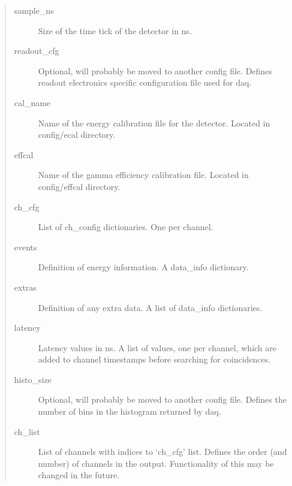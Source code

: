 \documentclass[letterpaper,10pt,english]{sphinxmanual}
\begin{document}
\begin{quote}
\begin{description}
\item[{sample\_ns}] \leavevmode
\sphinxAtStartPar
Size of the time tick of the detector in ns.

\item[{readout\_cfg}] \leavevmode
\sphinxAtStartPar
Optional, will probably be moved to another config file. Defines readout electronics
specific configuration file used for daq.

\item[{cal\_name}] \leavevmode
\sphinxAtStartPar
Name of the energy calibration file for the detector. Located in config/ecal directory.

\item[{effcal}] \leavevmode
\sphinxAtStartPar
Name of the gamma efficiency calibration file. Located in config/effcal directory.

\item[{ch\_cfg}] \leavevmode
\sphinxAtStartPar
List of ch\_config dictionaries. One per channel.

\item[{events}] \leavevmode
\sphinxAtStartPar
Definition of energy information. A data\_info dictionary.

\item[{extras}] \leavevmode
\sphinxAtStartPar
Definition of any extra data. A list of data\_info dictionaries.

\item[{latency}] \leavevmode
\sphinxAtStartPar
Latency values in ns. A list of values, one per channel, which are added to channel
timestamps before searching for coincidences.

\item[{histo\_size}] \leavevmode
\sphinxAtStartPar
Optional, will probably be moved to another config file. Defines the number of bins in
the histogram returned by daq.

\item[{ch\_list}] \leavevmode
\sphinxAtStartPar
List of channels with indices to ‘ch\_cfg’ list. Defines the order (and number) of
channels in the output. Functionality of this may be changed in the future.

\end{description}\end{quote}
\end{document}
